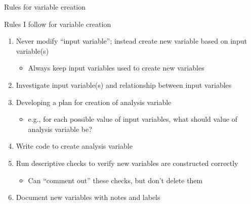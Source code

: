 \documentclass[8pt,ignorenonframetext,dvipsnames]{beamer}
\providecommand{\tightlist}{%
  \setlength{\itemsep}{0pt}\setlength{\parskip}{0pt}}
\let\olditem\item
\renewcommand{\item}{%
  \olditem\vspace{4pt}
}
\begin{document}
\begin{frame}{Rules for variable creation}

Rules I follow for variable creation

\begin{enumerate}
\def\labelenumi{\arabic{enumi}.}
\tightlist
\item
  \medskip Never modify ``input variable''; instead create new variable
  based on input variable(s)

  \begin{itemize}
  \tightlist
  \item
    Always keep input variables used to create new variables
  \end{itemize}
\item
  Investigate input variable(s) and relationship between input variables
\item
  Developing a plan for creation of analysis variable

  \begin{itemize}
  \tightlist
  \item
    e.g., for each possible value of input variables, what should value
    of analysis variable be?
  \end{itemize}
\item
  Write code to create analysis variable
\item
  Run descriptive checks to verify new variables are constructed
  correctly

  \begin{itemize}
  \tightlist
  \item
    Can ``comment out'' these checks, but don't delete them
  \end{itemize}
\item
  Document new variables with notes and labels
\end{enumerate}

\end{frame}
\end{document}
